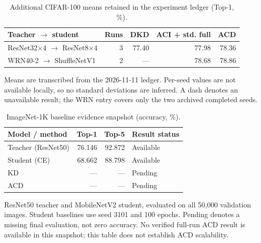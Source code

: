 \begin{table}[t]
\centering
\small
\setlength{\tabcolsep}{5pt}
\caption{Additional CIFAR-100 means retained in the experiment ledger (Top-1, \%).}
\label{tab:cifar_extended}
\begin{tabular}{lrrrr}
\toprule
Teacher $\to$ student & Runs & DKD & ACI + std. full & ACD \\
\midrule
ResNet32$\times$4 $\to$ ResNet8$\times$4 & 3 & 77.40 & 77.98 & 78.36 \\
WRN40-2 $\to$ ShuffleNetV1 & 2 & — & 78.68 & 78.86 \\
\bottomrule
\end{tabular}
\par\smallskip
\begin{minipage}{0.96\textwidth}\footnotesize
Means are transcribed from the 2026-11-11 ledger. Per-seed values are not available locally, so no standard deviations are inferred. A dash denotes an unavailable result; the WRN entry covers only the two archived completed seeds.
\end{minipage}
\end{table}

\begin{table}[t]
\centering
\small
\setlength{\tabcolsep}{5pt}
\caption{ImageNet-1K baseline evidence snapshot (accuracy, \%).}
\label{tab:imagenet}
\begin{tabular}{lrrl}
\toprule
Model / method & Top-1 & Top-5 & Result status \\
\midrule
Teacher (ResNet50) & 76.146 & 92.872 & Available \\
Student (CE) & 68.662 & 88.798 & Available \\
KD & — & — & Pending \\
ACD & — & — & Pending \\
\bottomrule
\end{tabular}
\par\smallskip
\begin{minipage}{0.96\textwidth}\footnotesize
ResNet50 teacher and MobileNetV2 student, evaluated on all 50,000 validation images. Student baselines use seed 3101 and 100 epochs. Pending denotes a missing final evaluation, not zero accuracy. No verified full-run ACD result is available in this snapshot; this table does not establish ACD scalability.
\end{minipage}
\end{table}

